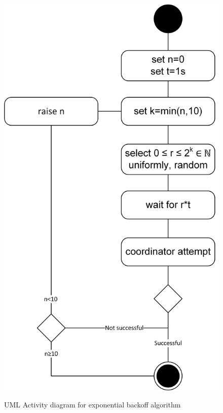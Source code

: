 		\begin{figure}[htbp] %
		\caption{\gls{UML} Activity diagram for exponential backoff algorithm}
		\includegraphics[scale=0.8]{figures/exponential-backoff.png}
		\label{figure:coordinator exponential backoff}
		\end{figure}
		
		
